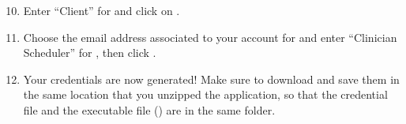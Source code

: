\documentclass[letterpaper,10pt,english]{sphinxmanual}
\begin{document}
\begin{DUlineblock}{0em}
\item[] 
\end{DUlineblock}
\begin{enumerate}
\setcounter{enumi}{9}
\item {} 
Enter “Client” for  and click on .

\end{enumerate}

\begin{figure}[htbp]
\centering
{}\end{figure}

\begin{DUlineblock}{0em}
\item[] 
\end{DUlineblock}
\begin{enumerate}
\setcounter{enumi}{10}
\item {} 
Choose the email address associated to your account for 
and enter “Clinician Scheduler” for , then
click .

\end{enumerate}

\begin{figure}[htbp]
\centering
{}\end{figure}

\begin{DUlineblock}{0em}
\item[] 
\end{DUlineblock}
\begin{enumerate}
\setcounter{enumi}{11}
\item {} 
Your credentials are now generated! Make sure to download and save
them in the same location that you unzipped the application, so that
the credential file and the executable file () are in the same folder.

\end{enumerate}

\begin{figure}[htbp]
\centering
{}\end{figure}
\end{document}
